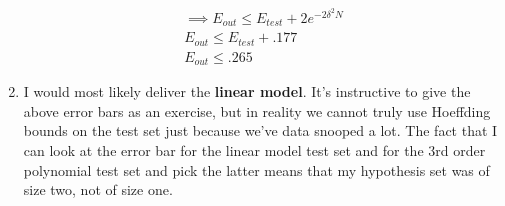 \documentclass[12pt]{article}
\begin{document}
\begin{enumerate}[label=(\alph*)]
\begin{gather*}
	 	\\ \implies E_{out} \le E_{test} + 2e^{-2\delta^2N}
	 	\\ E_{out} \le E_{test} + .177
	 	\\ E_{out} \le \boldsymbol{.265}
 	\end{gather*}
 	\item I would most likely deliver the \textbf{linear model}. It's instructive to give the above error bars as an exercise, but in reality we cannot truly use Hoeffding bounds on the test set just because we've data snooped a lot. The fact that I can look at the error bar for the linear model test set and for the 3rd order polynomial test set and pick the latter means that my hypothesis set was of size two, not of size one.
\end{enumerate}
\end{document}
